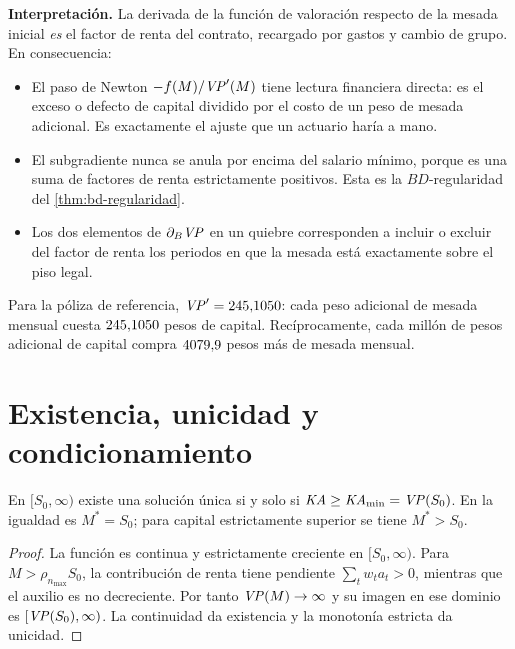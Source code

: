 \begin{aporte}
\textbf{Interpretación.} La derivada de la función de valoración respecto de la
mesada inicial \emph{es} el factor de renta del contrato, recargado por gastos y
cambio de grupo. En consecuencia:
\begin{itemize}[nosep,leftmargin=*]
  \item El paso de Newton $-f(M)/\mathit{VP}'(M)$ tiene lectura financiera directa: es el
        exceso o defecto de capital dividido por el costo de un peso de mesada
        adicional. Es exactamente el ajuste que un actuario haría a mano.
  \item El subgradiente nunca se anula por encima del salario mínimo, porque es
        una suma de factores de renta estrictamente positivos. Esta es la
        $BD$-regularidad del \cref{thm:bd-regularidad}.
  \item Los dos elementos de $\partial_B\mathit{VP}$ en un quiebre corresponden a incluir o
        excluir del factor de renta los periodos en que la mesada está exactamente
        sobre el piso legal.
\end{itemize}
\end{aporte}

Para la póliza de referencia, $\mathit{VP}'=245{,}1050$: cada peso adicional de
mesada mensual cuesta $245{,}1050$ pesos de capital. Recíprocamente, cada
millón de pesos adicional de capital compra $4079{,}9$ pesos
más de mesada mensual.

\section{Existencia, unicidad y condicionamiento}

\begin{theorem}
\label{thm:existencia}
En $[S_0,\infty)$ existe una solución única si y solo si
$\mathit{KA}\ge\mathit{KA}_{\min}=\mathit{VP}(S_0)$. En la igualdad es $M^*=S_0$;
para capital estrictamente superior se tiene $M^*>S_0$.
\end{theorem}
\begin{proof}
La función es continua y estrictamente creciente en $[S_0,\infty)$.
Para $M>\rho_{n_{\max}}S_0$, la contribución de renta tiene pendiente
$\sum_t w_ta_t>0$, mientras que el auxilio es no decreciente.
Por tanto $\mathit{VP}(M)\to\infty$ y su imagen en ese dominio es
$[\mathit{VP}(S_0),\infty)$. La continuidad da existencia y la monotonía
estricta da unicidad.
\end{proof}

